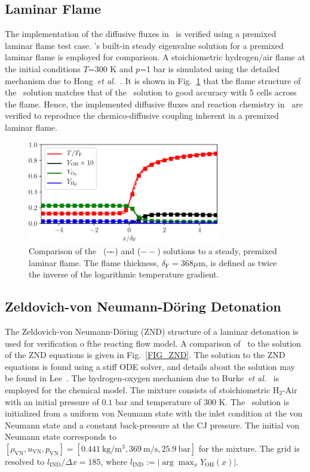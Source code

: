 \subsection{Laminar Flame}
The implementation of the diffusive fluxes in \stnshk\ is verified using a premixed laminar flame test case. \cantera's built-in steady eigenvalue solution for a premixed laminar flame is employed for comparison. A stoichiometric hydrogen/air flame at the initial conditions $T$=300 K and $p$=1 bar is simulated using the detailed mechanism due to Hong~\emph{et al.}~\cite{HONG_DAVIDSON_HANSON_CF11}. It is shown in Fig.~\ref{FIG_LF} that the flame structure of the \stnshk\ solution matches that of the \cantera\ solution to good accuracy with 5 cells across the flame. Hence, the implemented diffusive fluxes and reaction chemistry in \stnshk\ are verified to reproduce the chemico-diffusive coupling inherent in a premixed laminar flame. 
\begin{figure}[!ht!]
	\centering
	\includegraphics[width=84mm]{laminarFlame.pdf}
	\caption{\label{FIG_LF} Comparison of the \stnshk\ (-$\square$-) and \cantera ($--$) solutions to a steady, premixed laminar flame. The flame thickness, $\delta_\mathrm{F}=368\mu$m, is defined as twice the inverse of the logarithmic temperature gradient. }
\end{figure}
\subsection{Zeldovich-von Neumann-D\"oring Detonation}

The Zeldovich-von Neumann-D\"oring (ZND) structure of a laminar detonation  is used for verification o fthe reacting flow model. A comparison of \stnshk\ to the solution of the ZND equations is given in Fig.~\ref{FIG_ZND}. The solution to the ZND equations is found using a stiff ODE solver, and details about the solution may be found in Lee~\cite{LEE_BOOK2008}. The hydrogen-oxygen mechanism due to Burke~\emph{et al.}~\cite{BURKE_CHAOS_JU_DRYER_KLIPPENSTEIN_IJCK20112} is employed for the chemical model. The mixture consists of stoichiometric H$_2$-Air with an initial pressure of $0.1$ bar and temperature of 300 K. The \stnshk\ solution is initialized from a uniform von Neumann state with the inlet condition at the von Neumann state and a constant back-pressure at the CJ pressure. The initial von Neumann state corresponds to $[\rho_\mathrm{VN},u_\mathrm{VN},p_\mathrm{VN}]=[0.441\ \mathrm{kg/m^3}, 	369\ \mathrm{m/s},25.9\ \mathrm{bar}]$ for the mixture. The grid is resolved to $l_\mathrm{IND}/\Delta x=185$, where $l_\mathrm{IND}:=|\arg\max_{x}Y_\mathrm{OH}(x)|$. 

